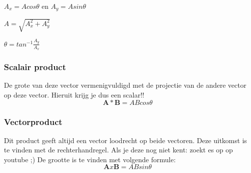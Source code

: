 \documentclass[12pt,a4paper]{article}
\begin{document}
    \(A_x = Acos\theta\) en \(A_y = Asin\theta\)

    \(A = \sqrt{A_x^2 + A_y^2}\)

    \(\theta = tan^{-1}\frac{A_y}{A_x}\)

    \subsubsection{Scalair product}
    De grote van deze vector vermenigvuldigd met de projectie van de andere vector op deze vector. Hieruit krijg je dus een scalar!!
    \[\textbf{A} * \textbf{B} = ABcos\theta\]

    \subsubsection{Vectorproduct}
    Dit product geeft altijd een vector loodrecht op beide vectoren. Deze uitkomst is te vinden met de rechterhandregel. Als je deze nog niet kent: zoekt es op op youtube ;)
    De grootte is te vinden met volgende formule:
    \[\textbf{A} x \textbf{B} = ABsin\theta\]
\end{document}
